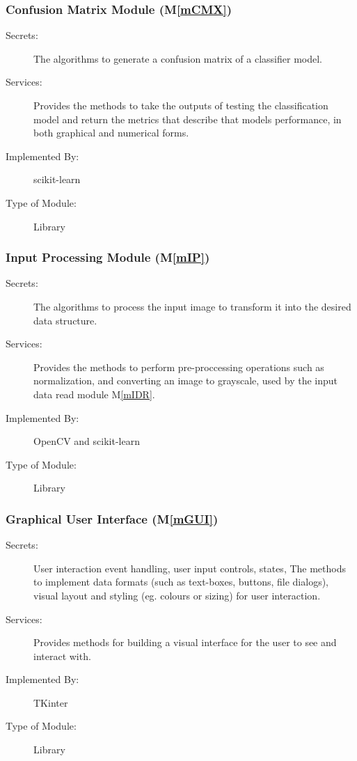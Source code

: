 \documentclass[12pt, titlepage]{article}
\newcommand{\mref}[1]{M\ref{#1}}
\begin{document}
\subsubsection{Confusion Matrix Module (\mref{mCMX})}

\begin{description}
\item[Secrets:] The algorithms to generate a confusion matrix of a classifier model.
\item[Services:] Provides the methods to take the outputs of testing the classification model and return the metrics that describe
that models performance, in both graphical and numerical forms.
\item[Implemented By:] scikit-learn
\item[Type of Module:] Library
\end{description}

\subsubsection{Input Processing Module (\mref{mIP})}

\begin{description}
\item[Secrets:] The algorithms to process the input image to transform it into the desired data structure.
\item[Services:] Provides the methods to perform pre-proccessing operations such as normalization, and converting an image to grayscale,
used by the input data read module \mref{mIDR}.
\item[Implemented By:] OpenCV and scikit-learn
\item[Type of Module:] Library
\end{description}

\subsubsection{Graphical User Interface (\mref{mGUI})}

\begin{description}
\item[Secrets:] User interaction event handling, user input controls, states, The methods to implement data formats (such as text-boxes, buttons, file dialogs),
visual layout and styling (eg. colours or sizing) for user interaction.
\item[Services:] Provides methods for building a visual interface for the user to see and interact with.
\item[Implemented By:] TKinter
\item[Type of Module:] Library
\end{description}
\end{document}
